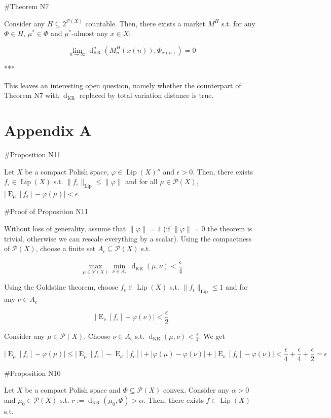 \documentclass[a4paper]{article}
\DeclareMathOperator{\E}{E}
\newcommand{\Abs}[1]{\lvert #1 \rvert}
\newcommand{\Norm}[1]{\lVert #1 \rVert}
\newcommand{\Prob}{\mathcal{P}}
\newcommand{\Lip}{\operatorname{Lip}}
\newcommand{\NormL}[1]{\Norm{#1}_{\operatorname{Lip}}}
\newcommand{\Dkr}{\operatorname{d}_{\text{KR}}}
\begin{document}
\#Theorem N7

Consider any ${H \subseteq 2^{\Prob(X)}}$ countable. Then, there exists a market ${M^H}$ s.t. for any ${\Phi \in H}$, ${\mu^* \in \Phi}$ and ${\mu^*}$-almost any ${x \in X}$:

$$\lim_{n \rightarrow \infty} \Dkr^n(M^H_n(x(n)),\Phi_{x(n)}) = 0$$

***

This leaves an interesting open question, namely whether the counterpart of Theorem N7 with ${\Dkr}$ replaced by total variation distance is true.

\section{Appendix A}

\#Proposition N11

Let $X$ be a compact Polish space, $\varphi \in \Lip(X)''$ and $\epsilon > 0$. Then, there exists $f_\epsilon \in \Lip(X)$ s.t. $\NormL{f_\epsilon} \leq \Norm{\varphi}$ and for all $\mu \in \Prob(X)$, $\Abs{\E_\mu[f_\epsilon] - \varphi(\mu)} < \epsilon$.

\#Proof of Proposition N11

Without loss of generality, assume that $\Norm{\varphi}=1$ (if $\Norm{\varphi}=0$ the theorem is trivial, otherwise we can rescale everything by a scalar). Using the compactness of $\Prob(X)$, choose a finite set $A_\epsilon \subseteq \Prob(X)$ s.t. 

$$\max_{\mu \in \Prob(X)} \min_{\nu \in A_\epsilon}\, \Dkr(\mu,\nu) < \frac{\epsilon}{4}$$

Using the Goldstine theorem, choose $f_\epsilon \in \Lip(X)$ s.t. $\NormL{f_\epsilon} \leq 1$ and for any $\nu \in A_\epsilon$ 

$$\Abs{\E_\nu[f_\epsilon] - \varphi(\nu)} < \frac{\epsilon}{2}$$

Consider any $\mu \in \Prob(X)$. Choose $\nu \in A_\epsilon$ s.t. $\Dkr(\mu,\nu) < \frac{\epsilon}{4}$. We get

$$\Abs{\E_\mu[f_\epsilon] - \varphi(\mu)} \leq \Abs{\E_\mu[f_\epsilon] - \E_\nu[f_\epsilon]} + \Abs{\varphi(\mu) - \varphi(\nu)} + \Abs{\E_\nu[f_\epsilon] - \varphi(\nu)} < \frac{\epsilon}{4} + \frac{\epsilon}{4} + \frac{\epsilon}{2} = \epsilon$$

\#Proposition N10

Let $X$ be a compact Polish space and $\Phi \subseteq \Prob(X)$ convex. Consider any $\alpha > 0$ and $\mu_0 \in \Prob(X)$ s.t. $r:=\Dkr(\mu_0, \Phi) > \alpha$. Then, there exists $f \in \Lip(X)$ s.t.
\end{document}
